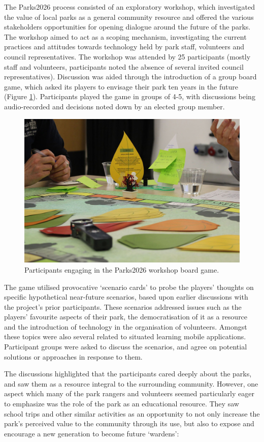 The Parks2026 process consisted of an exploratory workshop, which investigated the value of local parks as a general community resource and offered the various stakeholders opportunities for opening dialogue around the future of the parks. The workshop aimed to act as a scoping mechanism, investigating the current practices and attitudes towards technology held by park staff, volunteers and council representatives. The workshop was attended by 25 participants (mostly staff and volunteers, participants noted the absence of several invited council representatives). Discussion was aided through the introduction of a group board game, which asked its players to envisage their park ten years in the future (Figure \ref{fig:parks2026}). Participants played the game in groups of 4-5, with discussions being audio-recorded and decisions noted down by an elected group member.

\begin{figure}
  \centering
  \includegraphics[width=0.8\columnwidth]{images/chapter04/parks2026.jpg}
  \caption{Participants engaging in the Parks2026 workshop board game.}
  \label{fig:parks2026}
\end{figure}

The game utilised provocative `scenario cards' to probe the players’ thoughts on specific hypothetical near-future scenarios, based upon earlier discussions with the project's prior participants. These scenarios addressed issues such as the players’ favourite aspects of their park, the democratisation of it as a resource and the introduction of technology in the organisation of volunteers. Amongst these topics were also several related to situated learning mobile applications. Participant groups were asked to discuss the scenarios, and agree on potential solutions or approaches in response to them.

The discussions highlighted that the participants cared deeply about the parks, and saw them as a resource integral to the surrounding community. However, one aspect which many of the park rangers and volunteers seemed particularly eager to emphasize was the role of the park as an educational resource. They saw school trips and other similar activities as an opportunity to not only increase the park’s perceived value to the community through its use, but also to expose and encourage a new generation to become future ‘wardens’:

